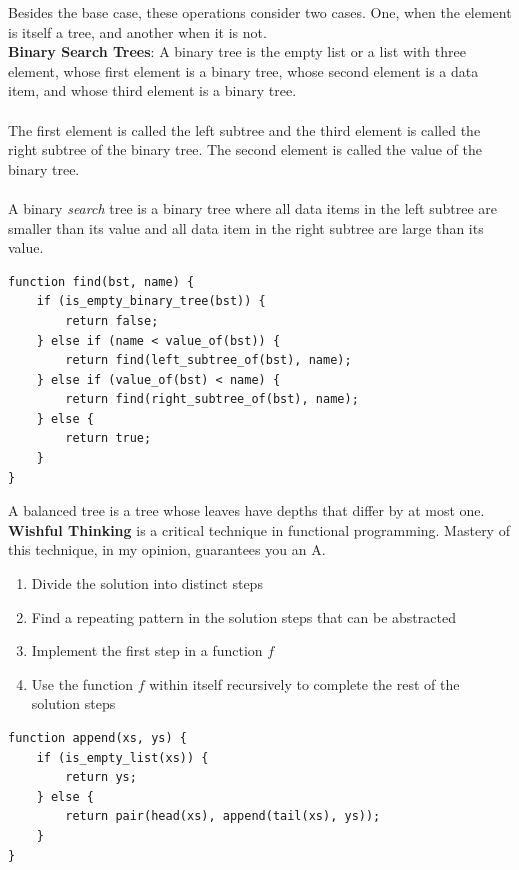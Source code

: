 \documentclass[a4paper]{article} \usepackage[backend=biber, style=numeric, sorting=none]{biblatex}
\begin{document}
\begin{multicols*}{4}
Besides the base case, these operations consider two cases. One, when the element is itself a tree, and another when it is not. \\

{\small\textbf{Binary Search Trees}}: A binary tree is the empty list or a list with three element, whose first element is a binary tree, whose second element is a data item, and whose third element is a binary tree.
\\ \\
The first element is called the left subtree and the third element is called the right subtree of the binary tree. The second element is called the value of the binary tree.
\\ \\
A binary \textit{search} tree is a binary tree where all data items in the left subtree are smaller than its value and all data item in the right subtree are large than its value.

\begin{verbatim}
function find(bst, name) {
    if (is_empty_binary_tree(bst)) {
        return false;
    } else if (name < value_of(bst)) {
        return find(left_subtree_of(bst), name);
    } else if (value_of(bst) < name) {
        return find(right_subtree_of(bst), name);
    } else {
        return true;
    }
}
\end{verbatim}

A balanced tree is a tree whose leaves have depths that differ by at most one.\\

{\small\textbf{Wishful Thinking}} is a critical technique in functional programming. Mastery of this technique, in my opinion, guarantees you an A.

\begin{enumerate}
\itemsep -0.5em
\item Divide the solution into distinct steps
\item Find a repeating pattern in the solution steps that can be abstracted
\item Implement the first step in a function $f$
\item Use the function $f$ within itself recursively to complete the rest of the solution steps
\end{enumerate}

\begin{verbatim}
function append(xs, ys) {
    if (is_empty_list(xs)) {
        return ys;
    } else {
        return pair(head(xs), append(tail(xs), ys));
    }
}
\end{verbatim}


\end{multicols*}
\end{document}
